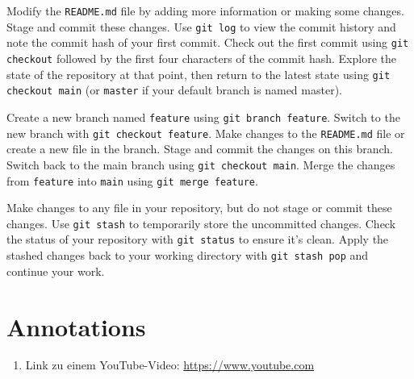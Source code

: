 \documentclass{dcbl/challenge}
\begin{document}
\begin{aufgabe}
    Modify the \texttt{README.md} file by adding more information or making some changes.
    Stage and commit these changes.
    Use \texttt{git log} to view the commit history and note the commit hash of your first commit.
    Check out the first commit using \texttt{git checkout} followed by the first four characters of the commit hash.
    Explore the state of the repository at that point, then return to the latest state using \texttt{git checkout main} (or \texttt{master} if your default branch is named master).
\end{aufgabe}
\begin{aufgabe}
    Create a new branch named \texttt{feature} using \texttt{git branch feature}.
    Switch to the new branch with \texttt{git checkout feature}.
    Make changes to the \texttt{README.md} file or create a new file in the branch.
    Stage and commit the changes on this branch.
    Switch back to the main branch using \texttt{git checkout main}.
    Merge the changes from \texttt{feature} into \texttt{main} using \texttt{git merge feature}.
    
\end{aufgabe}
\begin{aufgabe}
    Make changes to any file in your repository, but do not stage or commit these changes.
    Use \texttt{git stash} to temporarily store the uncommitted changes.
    Check the status of your repository with \texttt{git status} to ensure it's clean.
    Apply the stashed changes back to your working directory with \texttt{git stash pop} and continue your work.

\end{aufgabe}

\section*{Annotations}
\begin{enumerate}
    \item Link zu einem YouTube-Video: \url{https://www.youtube.com}
\end{enumerate}
\end{document}
